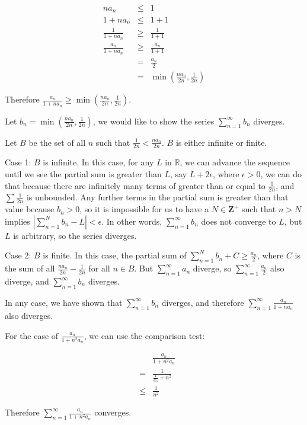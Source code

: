\begin{eqnarray*}
                  na_n &\le& 1 \\
              1 + na_n &\le& 1 + 1 \\
    \frac{1}{1 + na_n} &\ge& \frac{1}{1 + 1} \\
  \frac{a_n}{1 + na_n} &\ge& \frac{a_n}{1 + 1} \\
                       & = & \frac{a_n}{2} \\
                       & = & \min(\frac{na_n}{2n}, \frac{1}{2n})
\end{eqnarray*}

Therefore $ \frac{a_n}{1 + na_n} \ge \min(\frac{na_n}{2n}, \frac{1}{2n}) $.

Let $ b_n = \min(\frac{na_n}{2n}, \frac{1}{2n}) $, we would like to show the series $ \sum\limits_{n=1}^{\infty} b_n $ diverges.

Let $ B $ be the set of all $ n $ such that $ \frac{1}{2n} < \frac{na_n}{2n} $. $ B $ is either infinite or finite.

Case 1: $ B $ is infinite. In this case, for any $ L $ in $ \mathbb{R} $, we can advance the sequence until we see the partial sum is greater than $ L $, say $ L + 2\epsilon $, where $ \epsilon > 0 $, we can do that because there are infinitely many terms of greater than or equal to $ \frac{1}{2n} $, and $ \sum \frac{1}{2n} $ is unbounded. Any further terms in the partial sum is greater than that value because $ b_n > 0 $, so it is impossible for us to have a $ N \in \mathbf{Z^+} $ such that $ n > N $ implies $ |\sum\limits_{n=1}^{N} b_n - L| < \epsilon $. In other words, $ \sum\limits_{n=1}^{\infty} b_n $ does not converge to $ L $, but $ L $ is arbitrary, so the series diverges.

Case 2: $ B $ is finite. In this case, the partial sum of $ \sum\limits_{n=1}^{N} b_n + C \ge \frac{a_n}{2} $, where $ C $ is the sum of all $ \frac{na_n}{2n} - \frac{1}{2n} $ for all $ n \in B $. But $  \sum\limits_{n=1}^{\infty} a_n $ diverge, so $  \sum\limits_{n=1}^{\infty} \frac{a_n}{2} $ also diverge, and $ \sum\limits_{n=1}^{\infty} b_n $ diverges.

In any case, we have shown that $ \sum\limits_{n=1}^{\infty} b_n $ diverges, and therefore $ \sum\limits_{n=1}^{\infty} \frac{a_n}{1 + na_n} $ also diverges.

For the case of $ \frac{a_n}{1 + n^2 a_n} $, we can use the comparison test:

\begin{eqnarray*}
  &   & \frac{a_n}{1 + n^2 a_n} \\
  & = & \frac{1}{\frac{1}{a_n} + n^2} \\
  &\le& \frac{1}{n^2}
\end{eqnarray*}

Therefore $ \sum\limits_{n=1}^{\infty} \frac{a_n}{1 + n^2 a_n} $ converges.